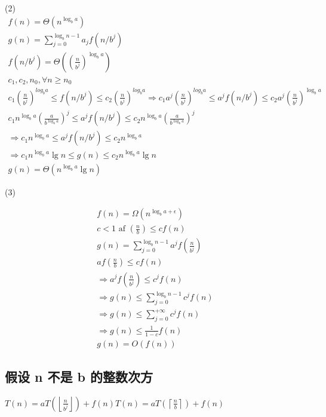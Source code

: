 (2)
$$
\begin{array}{l}
f(n)=\Theta\left(n^{\log _{b} a}\right) \\
g(n)=\sum_{j=0}^{\log _{b} n-1} a_{j} f\left(n / b^{j}\right) \\
f\left(n / b^{j}\right)=\Theta\left(\left(\frac{n}{b^{j}}\right)^{\log _{b} a}\right) \\
c_{1}, c_{2}, n_{0}, \forall n \geq n_{0} \\
c_{1}\left(\frac{n}{b^{j}}\right)^{l o g_{b} a} \leq f\left(n / b^{j}\right) \leq c_{2}\left(\frac{n}{b^{j}}\right)^{l o g_{b} a} \Rightarrow c_{1} a^{j}\left(\frac{n}{b^{j}}\right)^{l o g_{b} a} \leq a^{j} f\left(n / b^{j}\right) \leq c_{2} a^{j}\left(\frac{n}{b^{j}}\right)^{\log _{b} a} \\
c_{1} n^{\log _{b} a}\left(\frac{a}{b^{\log _{b} a}}\right)^{j} \leq a^{j} f\left(n / b^{j}\right) \leq c_{2} n^{\log _{b} a}\left(\frac{a}{b^{\log _{b} a}}\right)^{j} \\
\Rightarrow c_{1} n^{\log _{b} a} \leq a^{j} f\left(n / b^{j}\right) \leq c_{2} n^{\log _{b} a} \\
\Rightarrow c_{1} n^{\log _{b} a} \lg n \leq g(n) \leq c_{2} n^{\log _{b} a} \lg n \\
g(n)=\Theta\left(n^{\log _{b} a} \lg n\right)
\end{array}
$$
 

(3)

$$
\begin{array}{l}
f(n)=\Omega\left(n^{\log _{b} a+\epsilon}\right) \\
c<1 \text { af }\left(\frac{n}{b}\right) \leq c f(n) \\
g(n)=\sum_{j=0}^{\log _{b} n-1} a^{j} f\left(\frac{n}{b^{j}}\right) \\
a f\left(\frac{n}{b}\right) \leq c f(n) \\
\Rightarrow a^{j} f\left(\frac{n}{b^{j}}\right) \leq c^{j} f(n) \\
\Rightarrow g(n) \leq \sum_{j=0}^{\log _{b} n-1} c^{j} f(n) \\
\Rightarrow g(n) \leq \sum_{j=0}^{+\infty} c^{j} f(n)\\
\Rightarrow g(n) \leq \frac{1}{1-c} f(n) \\
g(n)=O(f(n))
\end{array}
$$

\subsection{假设 n 不是 b 的整数次方}
$T(n)=a T\left(\left\lfloor\frac{n}{b^{j}}\right\rfloor\right)+f(n) T(n)=a T\left(\left\lceil\frac{n}{b}\right\rceil\right)+f(n)$

